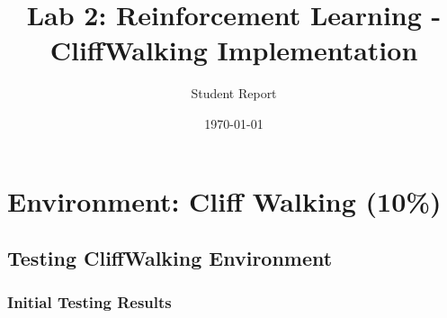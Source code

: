 \documentclass{article}
\title{Lab 2: Reinforcement Learning - CliffWalking Implementation}
\author{Student Report}
\date{\today}
\begin{document}
\maketitle

\section{Environment: Cliff Walking (10\%)}

\subsection{Testing CliffWalking Environment}
\subsubsection{Initial Testing Results}
\end{document}
